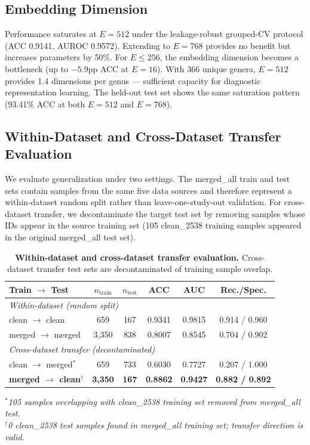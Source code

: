 \documentclass{article} %
\begin{document}
\subsection{Embedding Dimension}



Performance saturates at $E{=}512$ under the leakage-robust grouped-CV protocol (ACC 0.9141, AUROC 0.9572). Extending to $E{=}768$ provides no benefit but increases parameters by 50\%. For $E{\leq}256$, the embedding dimension becomes a bottleneck (up to $-5.9$pp ACC at $E{=}16$). With 366 unique genera, $E{=}512$ provides 1.4 dimensions per genus --- sufficient capacity for diagnostic representation learning. The held-out test set shows the same saturation pattern (93.41\% ACC at both $E{=}512$ and $E{=}768$).

\subsection{Within-Dataset and Cross-Dataset Transfer Evaluation}

We evaluate generalization under two settings. The merged\_all train and test sets contain samples from the same five data sources and therefore represent a within-dataset random split rather than leave-one-study-out validation. For cross-dataset transfer, we decontaminate the target test set by removing samples whose IDs appear in the source training set (105 clean\_2538 training samples appeared in the original merged\_all test set).

\begin{table}[ht]
\centering
\caption{\textbf{Within-dataset and cross-dataset transfer evaluation.}
Cross-dataset transfer test sets are decontaminated of training sample overlap.}
\label{tab:transfer}
\begin{tabular}{lccccc}
\toprule
\textbf{Train $\rightarrow$ Test} & \textbf{$n_\text{train}$} & \textbf{$n_\text{test}$} & \textbf{ACC} & \textbf{AUC} & \textbf{Rec./Spec.} \\
\midrule
\multicolumn{6}{l}{\textit{Within-dataset (random split)}} \\
\;\; clean $\rightarrow$ clean & 659 & 167 & 0.9341 & 0.9815 & 0.914 / 0.960 \\
\;\; merged $\rightarrow$ merged & 3,350 & 838 & 0.8007 & 0.8545 & 0.704 / 0.902 \\
\midrule
\multicolumn{6}{l}{\textit{Cross-dataset transfer (decontaminated)}} \\
\;\; clean $\rightarrow$ merged$^*$ & 659 & 733 & 0.6030 & 0.7727 & 0.207 / 1.000 \\
\;\; \textbf{merged $\rightarrow$ clean$^\dagger$} & \textbf{3,350} & \textbf{167} & \textbf{0.8862} & \textbf{0.9427} & \textbf{0.882 / 0.892} \\
\bottomrule
\end{tabular}

\vspace{4pt}
\textit{$^*$105 samples overlapping with clean\_2538 training set removed from merged\_all test.\\
$^\dagger$0 clean\_2538 test samples found in merged\_all training set; transfer direction is valid.}
\end{table}
\end{document}
